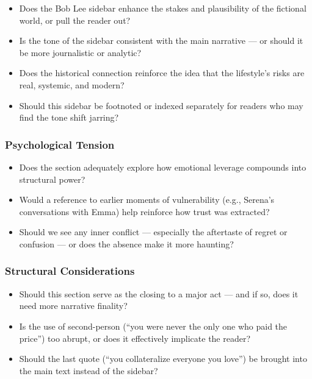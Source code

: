 \begin{itemize}
  \item Does the Bob Lee sidebar enhance the stakes and plausibility of the fictional world, or pull the reader out?
  \item Is the tone of the sidebar consistent with the main narrative — or should it be more journalistic or analytic?
  \item Does the historical connection reinforce the idea that the lifestyle’s risks are real, systemic, and modern?
  \item Should this sidebar be footnoted or indexed separately for readers who may find the tone shift jarring?
\end{itemize}

\subsubsection*{Psychological Tension}

\begin{itemize}
  \item Does the section adequately explore how emotional leverage compounds into structural power?
  \item Would a reference to earlier moments of vulnerability (e.g., Serena’s conversations with Emma) help reinforce how trust was extracted?
  \item Should we see any inner conflict — especially the aftertaste of regret or confusion — or does the absence make it more haunting?
\end{itemize}

\subsubsection*{Structural Considerations}

\begin{itemize}
  \item Should this section serve as the closing to a major act — and if so, does it need more narrative finality?
  \item Is the use of second-person (“you were never the only one who paid the price”) too abrupt, or does it effectively implicate the reader?
  \item Should the last quote (``you collateralize everyone you love'') be brought into the main text instead of the sidebar?
\end{itemize}

